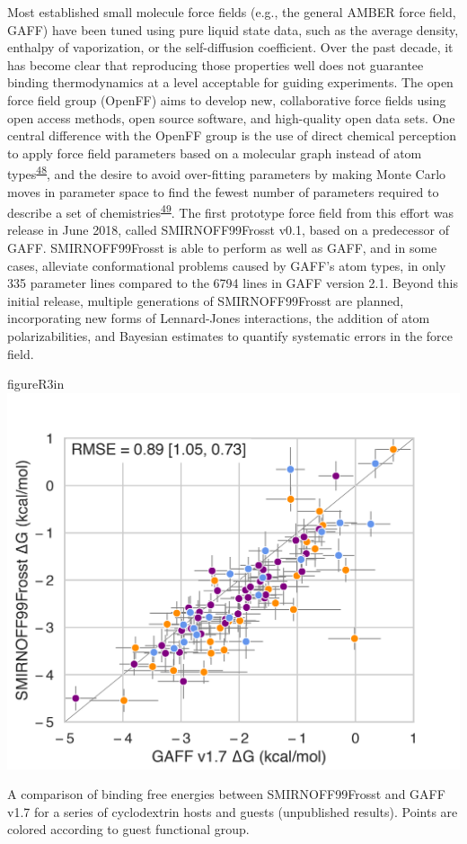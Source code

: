 \documentclass[11pt,notitlepage]{article}
\begin{document}
Most established small molecule force fields (e.g., the general AMBER
force field, GAFF) have been tuned using pure liquid state data, such as
the average density, enthalpy of vaporization, or the self-diffusion
coefficient. Over the past decade, it has become clear that reproducing
those properties well does not guarantee binding thermodynamics at a
level acceptable for guiding experiments. The open force field group
(OpenFF) aims to develop new, collaborative force fields using open
access methods, open source software, and high-quality open data sets.
One central difference with the OpenFF group is the use of direct
chemical perception to apply force field parameters based on a molecular
graph instead of atom
types\textsuperscript{\protect\hyperlink{ref-HlBr7NrU}{48}}, and the
desire to avoid over-fitting parameters by making Monte Carlo moves in
parameter space to find the fewest number of parameters required to
describe a set of
chemistries\textsuperscript{\protect\hyperlink{ref-13lTSBgHy}{49}}. The
first prototype force field from this effort was release in June 2018,
called SMIRNOFF99Frosst v0.1, based on a predecessor of GAFF.
SMIRNOFF99Frosst is able to perform as well as GAFF, and in some cases,
alleviate conformational problems caused by GAFF's atom types, in only
335 parameter lines compared to the 6794 lines in GAFF version 2.1.
Beyond this initial release, multiple generations of SMIRNOFF99Frosst
are planned, incorporating new forms of Lennard-Jones interactions, the
addition of atom polarizabilities, and Bayesian estimates to quantify
systematic errors in the force field.


\begin{wrapfloat}{figure}{R}{3in}
\centering
\includegraphics{content/images/SMIRNOFF-vs-GAFF-deltaG.png}
\caption{A comparison of binding free energies between SMIRNOFF99Frosst
and GAFF v1.7 for a series of cyclodextrin hosts and guests (unpublished
results). Points are colored according to guest functional group.}
\label{fig:smirnoff}
\end{wrapfloat}
\end{document}
